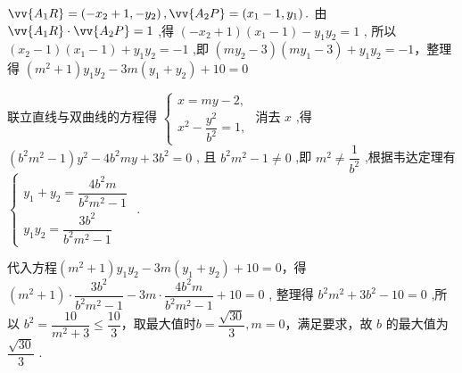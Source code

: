\begin{enumerate}
\begin{jieda}
\begin{enumerate}
            $\vv{{A}_{1}R} = \left( {-{x}_{2} + 1, - {y}_{2}}\right) ,\vv{{A}_{2}P} = \left( {{x}_{1} - 1,{y}_{1}}\right) .$
            由 $\vv{{A}_{1}R} \cdot  \vv{{A}_{2}P} = 1$ ,得 $\left( {-{x}_{2} + 1}\right) \left( {{x}_{1} - 1}\right)  - {y}_{1}{y}_{2} = 1$ ,
            所以 $\left( {{x}_{2} - 1}\right) \left( {{x}_{1} - 1}\right)  + {y}_{1}{y}_{2} =  - 1$ ,即 $\left( {m{y}_{2} - 3}\right) \left( {m{y}_{1} - 3}\right)  + {y}_{1}{y}_{2} =  - 1$，整理得 $\left(m^2 + 1\right) {y}_{1}{y}_{2} - {3m}\left( {{y}_{1} + {y}_{2}}\right)  + {10} = 0$

            联立直线与双曲线的方程得 $\left\{  \begin{array}{l} x = {my} - 2, \\  {x}^{2} - \dfrac{{y}^{2}}{{b}^{2}} = 1, \end{array}\right.$
            消去 $x$ ,得 $\left( {{b}^{2}{m}^{2} - 1}\right) {y}^{2} - 4{b}^{2}{my} + 3{b}^{2} = 0$ ,
            且 ${b}^{2}{m}^{2} - 1 \neq  0$ ,即 ${m}^{2} \neq  \dfrac{1}{{b}^{2}}$ ,根据韦达定理有$\left\{\begin{array}{l}
                 {y}_{1} + {y}_{2} = \dfrac{4{b}^{2}m}{{b}^{2}{m}^{2} - 1}  \\
                 {y}_{1}{y}_{2} = \dfrac{3{b}^{2}}{{b}^{2}{m}^{2} - 1} 
            \end{array}\right.$ .
            
            代入方程$\left(m^2 + 1\right) {y}_{1}{y}_{2} - {3m}\left( {{y}_{1} + {y}_{2}}\right)  + {10} = 0$，得$\left( {{m}^{2} + 1}\right)  \cdot  \dfrac{3{b}^{2}}{{b}^{2}{m}^{2} - 1} - {3m} \cdot  \dfrac{4{b}^{2}m}{{b}^{2}{m}^{2} - 1} + {10} = 0$ ,
            整理得 ${b}^{2}m^2 + 3{b}^{2} - {10} = 0$ ,所以 ${b}^{2} = \dfrac{10}{{m}^{2} + 3} \leq \dfrac{10}{3}$，取最大值时$b = \dfrac{\sqrt{30}}{3}, m = 0$，满足要求，故 $b$ 的最大值为 $\dfrac{\sqrt{30}}{3}$ .
        \end{enumerate}
    \end{jieda}
    
\end{enumerate}